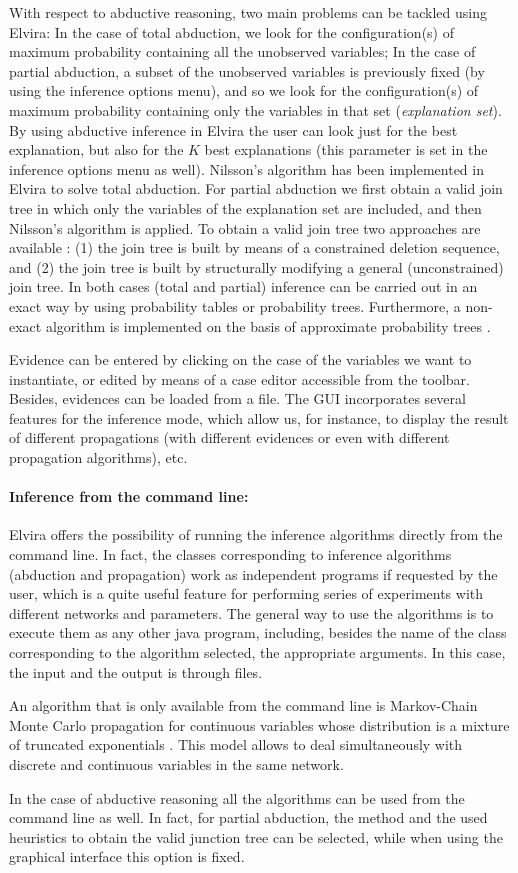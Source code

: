 With respect to abductive reasoning, two main problems can be
tackled using Elvira: In the case of total abduction, we look for
the configuration(s) of maximum probability containing all the
unobserved variables; In the case of partial abduction, a subset
of the unobserved variables is previously fixed (by using the
inference options menu), and so we look for the configuration(s)
of maximum probability containing only the variables in that set
({\em explanation set}). By using abductive inference in Elvira
the user can look just for the best explanation, but also for the
$K$ best explanations (this parameter is set in the inference
options menu as well). Nilsson's algorithm \cite{Nilsson-mpe} has
been implemented in Elvira to solve total abduction. For partial
abduction we first obtain a valid join tree in which only the
variables of the explanation set are included, and then Nilsson's
algorithm is applied. To obtain a valid join tree two approaches
are available \cite{cgm-libroIpmu00}: (1) the join tree is
built by means of a constrained deletion sequence, and (2) the
join tree is built by structurally modifying a general
(unconstrained) join tree. In both cases (total and partial)
inference can be carried out in an exact way by using probability
tables or probability trees. Furthermore, a non-exact algorithm is
implemented on the basis of approximate probability trees
\cite{cgm-caepia01}.


Evidence can be entered by clicking on the case of the variables
we want to instantiate, or edited by means of a case editor
accessible from the toolbar. Besides, evidences can be loaded from
a file. The GUI incorporates several features for the inference
mode, which allow us, for instance,
to display the result of different propagations (with
different evidences or even with different propagation
algorithms), etc.

\paragraph{Inference from the command line:}
Elvira offers the possibility of running the inference algorithms
directly from the command line. In fact, the classes corresponding
to inference algorithms (abduction and propagation) work as
independent programs if requested by the user, which is a quite
useful feature for performing series of experiments with different
networks and parameters. The general way to use the algorithms is
to execute them as any other java program, including, besides the
name of the class corresponding to the algorithm selected, the
appropriate arguments. In this case, the input and the output is
through files.

An algorithm that is only available from the command line is
Markov-Chain Monte Carlo propagation for continuous variables whose
distribution is a mixture of truncated exponentials \cite{Mor01}. This
model allows to deal simultaneously with discrete and continuous
variables in the same network.

In the case of abductive reasoning all the algorithms can be used
from the command line as well. In fact, for partial abduction, the
method and the used heuristics \cite{cgm-libroIpmu00} to obtain the
valid junction tree can be selected, while when using
the graphical interface this option is fixed.
